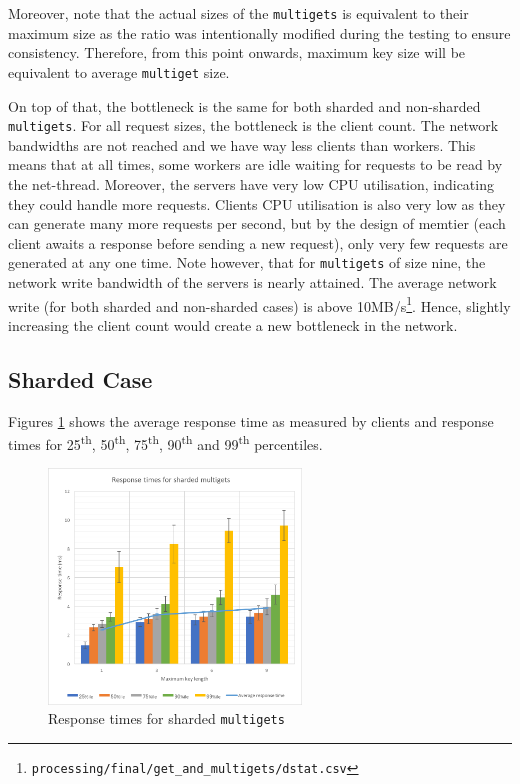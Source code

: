 \documentclass[11pt,a4paper]{article}
\begin{document}
Moreover, note that the actual sizes of the \texttt{multigets} is equivalent to their maximum size as the ratio was intentionally modified during the testing to ensure consistency. Therefore, from this point onwards, maximum key size will be equivalent to average \texttt{multiget} size.

On top of that, the bottleneck is the same for both sharded and non-sharded \texttt{multigets}. For all request sizes, the bottleneck is the client count. The network bandwidths are not reached and we have way less clients than workers. This means that at all times, some workers are idle waiting for requests to be read by the net-thread. Moreover, the servers have very low CPU utilisation, indicating they could handle more requests. Clients CPU utilisation is also very low as they can generate many more requests per second, but by the design of memtier (each client awaits a response before sending a new request), only very few requests are generated at any one time. Note however, that for \texttt{multigets} of size nine, the network write bandwidth of the servers is nearly attained. The average network write (for both sharded and non-sharded cases) is above 10MB/s\footnote{\texttt{processing/final/get_and_multigets/dstat.csv}}. Hence, slightly increasing the client count would create a new bottleneck in the network.

\subsection{Sharded Case}
Figures \ref{png::get_and_multigets_latency-keylen_sharded} shows the average response time as measured by clients and response times for 25\textsuperscript{th}, 50\textsuperscript{th}, 75\textsuperscript{th}, 90\textsuperscript{th} and 99\textsuperscript{th} percentiles.

\begin{figure}[!h]
    \centering
    \includegraphics[width=0.6\textwidth]{processing/graphics/get_and_multigets_latency-keylen_sharded.png}
    \caption{Response times for sharded \texttt{multigets}}
    \label{png::get_and_multigets_latency-keylen_sharded}
\end{figure}
\end{document}
